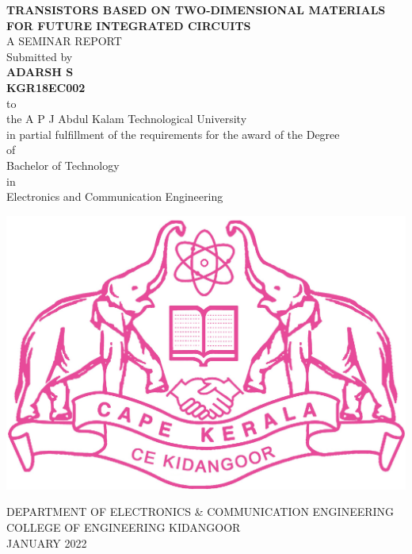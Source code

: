 \documentclass[12pt,a4paper]{report}
\begin{document}
\begin{center}
{\Large \textbf{TRANSISTORS BASED ON TWO-DIMENSIONAL MATERIALS
FOR FUTURE INTEGRATED CIRCUITS
}}\\
\vspace{2cm}
A SEMINAR REPORT\\
\vspace{0.5cm}
Submitted by \\
\vspace{1cm}
\textbf{ADARSH S}\\
\vspace{0.2cm}
\textbf{KGR18EC002}\\
\vspace{0.2cm} to\\


 the A P J Abdul Kalam Technological University \\
in partial fulfillment of the requirements for the award 
of the Degree \\
of\\
Bachelor of Technology \\
in\\
Electronics and Communication Engineering
\end{center}


\begin{center}

\vspace{1.2cm}

\includegraphics[scale=0.3]{ceklogo.jpg}

DEPARTMENT OF ELECTRONICS \& COMMUNICATION ENGINEERING\\

COLLEGE OF ENGINEERING KIDANGOOR\\

JANUARY 2022\\
\end{center}
\end{document}

